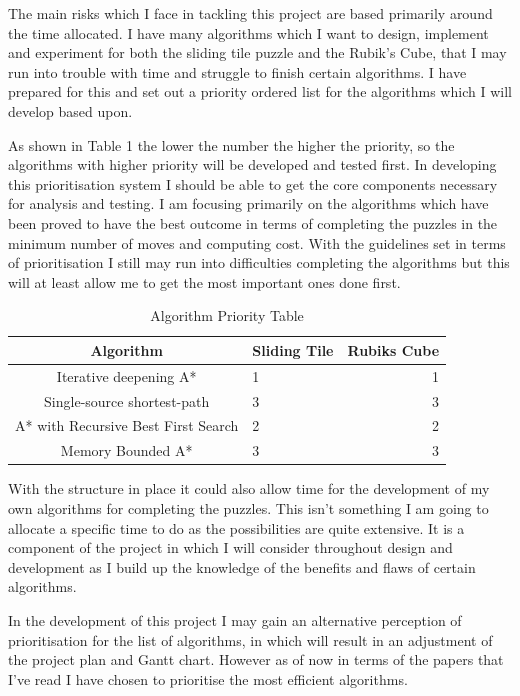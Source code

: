 \documentclass[review]{cmpreport}
\begin{document}
The main risks which I face in tackling this project are based primarily around the time allocated. I have many algorithms which I want to design, implement and experiment for both the sliding tile puzzle and the Rubik's Cube, that I may run into trouble with time and struggle to finish certain algorithms. I have prepared for this and set out a priority ordered list for the algorithms which I will develop based upon. 

As shown in Table 1 the lower the number the higher the priority, so the algorithms with higher priority will be developed and tested first. In developing this prioritisation system I should be able to get the core components necessary for analysis and testing. I am focusing primarily on the algorithms which have been proved to have the best outcome in terms of completing the puzzles in the minimum number of moves and computing cost. With the guidelines set in terms of prioritisation I still may run into difficulties completing the algorithms but this will at least allow me to get the most important ones done first.




\begin{table}[ht]
	\caption{Algorithm Priority Table}
	\begin{center}
		\begin{tabular}{clr} \hline
			Algorithm & Sliding Tile & Rubiks Cube \\ \hline
			Iterative deepening A*  & 1 & 1 \\
			Single-source shortest-path & 3 & 3 \\ 
			A* with Recursive Best First Search & 2 & 2 \\ 
			Memory Bounded A* & 3 & 3 \\ \hline
		\end{tabular}
	\end{center}
\end{table}

With the structure in place it could also allow time for the development of my own algorithms for completing the puzzles. This isn't something I am going to allocate a specific time to do as the possibilities are quite extensive. It is a component of the project in which I will consider throughout design and development as I build up the knowledge of the benefits and flaws of certain algorithms.

In the development of this project I may gain an alternative perception of prioritisation for the list of algorithms, in which will result in an adjustment of the project plan and Gantt chart. However as of now in terms of the papers that I've read I have chosen to prioritise the most efficient algorithms.   
\end{document}
